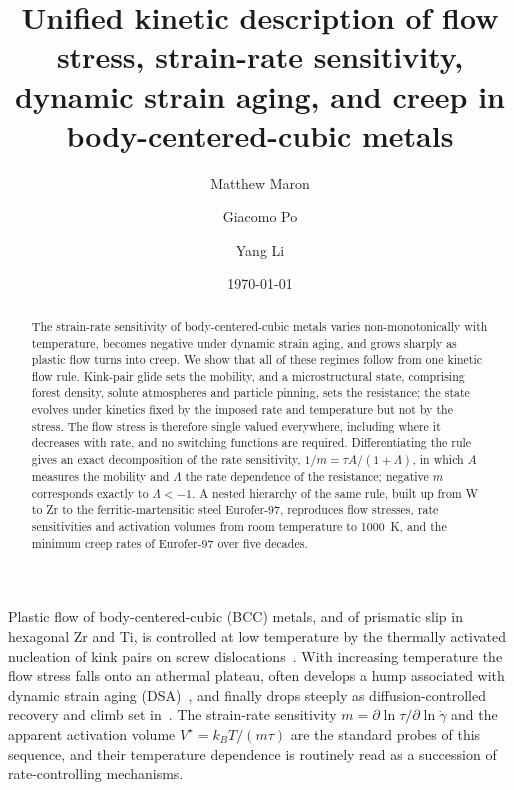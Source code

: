 \documentclass[aps,prl,twocolumn,superscriptaddress,amsmath,amssymb,floatfix]{revtex4-2}
\newcommand{\gd}{\dot\gamma}
\newcommand{\kT}{k_BT}
\newcommand{\todo}[1]{\textcolor{red}{[#1]}}
\begin{document}
\title{Unified kinetic description of flow stress, strain-rate sensitivity, dynamic strain aging, and creep in body-centered-cubic metals}

\author{Matthew Maron}
\affiliation{\todo{Affiliation}}
\author{Giacomo Po}
\affiliation{\todo{Affiliation}}
\author{Yang Li}
\affiliation{\todo{Affiliation}}

\date{\today}

\begin{abstract}
The strain-rate sensitivity of body-centered-cubic metals varies non-monotonically with temperature, becomes negative under dynamic strain aging, and grows sharply as plastic flow turns into creep. We show that all of these regimes follow from one kinetic flow rule. Kink-pair glide sets the mobility, and a microstructural state, comprising forest density, solute atmospheres and particle pinning, sets the resistance; the state evolves under kinetics fixed by the imposed rate and temperature but not by the stress. The flow stress is therefore single valued everywhere, including where it decreases with rate, and no switching functions are required. Differentiating the rule gives an exact decomposition of the rate sensitivity, $1/m=\tau A/(1+\Lambda)$, in which $A$ measures the mobility and $\Lambda$ the rate dependence of the resistance; negative $m$ corresponds exactly to $\Lambda<-1$. A nested hierarchy of the same rule, built up from W to Zr to the ferritic-martensitic steel Eurofer-97, reproduces flow stresses, rate sensitivities and activation volumes from room temperature to 1000~K, and the minimum creep rates of Eurofer-97 over five decades.
\end{abstract}

\maketitle

Plastic flow of body-centered-cubic (BCC) metals, and of prismatic slip in hexagonal Zr and Ti, is controlled at low temperature by the thermally activated nucleation of kink pairs on screw dislocations~\cite{HirthLothe,Po2016}. With increasing temperature the flow stress falls onto an athermal plateau, often develops a hump associated with dynamic strain aging (DSA)~\cite{Cheng2001,KubinEstrin1990}, and finally drops steeply as diffusion-controlled recovery and climb set in~\cite{FrostAshby}. The strain-rate sensitivity $m=\partial\ln\tau/\partial\ln\gd$ and the apparent activation volume $V^\star=\kT/(m\tau)$ are the standard probes of this sequence, and their temperature dependence is routinely read as a succession of rate-controlling mechanisms.
\end{document}
